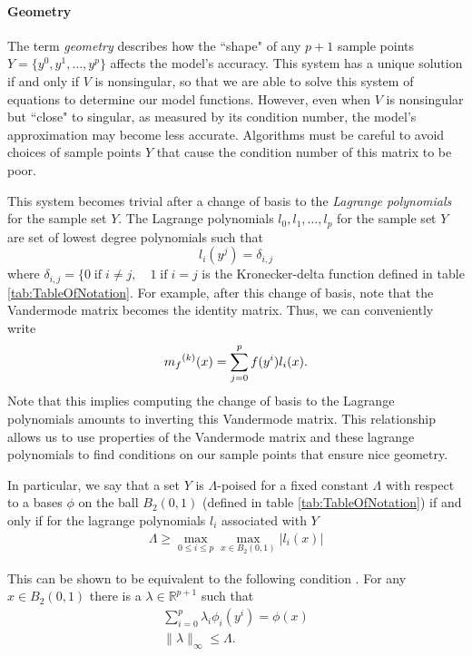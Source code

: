 \paragraph{Geometry}
\label{geometry}
The term \emph{geometry} describes how the ``shape" of any $p+1$ sample points $Y = \{y^0, y^1, \ldots, y^p\}$ affects the model's accuracy.
This system has a unique solution if and only if $V$ is nonsingular, so that we are able to solve this system of equations to determine our model functions.
However, even when $V$ is nonsingular but ``close" to singular, as measured by its condition number, the model's approximation may become less accurate.
Algorithms must be careful to avoid choices of sample points $Y$ that cause the condition number of this matrix to be poor.

This system becomes trivial after a change of basis to the \emph{Lagrange polynomials} for the sample set $Y$.
The Lagrange polynomials $l_0, l_1, \ldots, l_p$ for the sample set $Y$ are set of lowest degree polynomials such that
\[
l_i(y^j) = \delta_{i,j}
\]
where $\delta_{i,j} = \{0 \;\text{if}\; i\ne j,\quad 1 \;\text{if} \; i = j $ is the Kronecker-delta function defined in table \ref{tab:TableOfNotation}.
For example, after this change of basis, note that the Vandermode matrix becomes the identity matrix.
Thus, we can conveniently write
\[
\label{reg}
{{m}_f}^{(k)}(x) = \sum^p_{j=0}f(y^i)l_i(x).
\]
Note that this implies computing the change of basis to the Lagrange polynomials amounts to inverting this Vandermode matrix.
This relationship allows us to use properties of the Vandermode matrix and these lagrange polynomials to find conditions on our sample points that ensure nice geometry.

In particular, we say that a set $Y$ is $\Lambda$-poised for a fixed constant $\Lambda$ with respect to a bases $\phi$ on the ball 
$B_2(0, 1)$ (defined in table \ref{tab:TableOfNotation}) if and only if for the lagrange polynomials $l_i$ associated with $Y$
\begin{align}
\Lambda \ge \max_{0\le i\le p}\max_{x\in B_2(0, 1)}|l_i(x)|
\end{align}

This can be shown to be equivalent to the following condition \cite{DUMMY:intro_book}.
For any $x \in B_2(0, 1)$ there is a $\lambda \in \mathbb R ^ {p+1}$ such that 
\begin{align}
\sum_{i=0}^p\lambda_i\phi_i(y^i) = \phi(x) \\
\|\lambda\|_{\infty} \le \Lambda.
\end{align}


